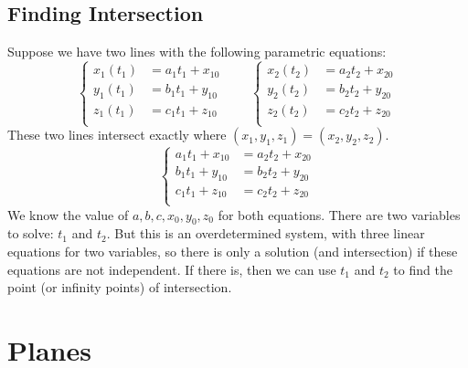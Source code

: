 \documentclass{article}
\begin{document}
\subsection{Finding Intersection}
Suppose we have two lines with the following parametric equations:
\begin{equation*}
	\left\{\begin{aligned}
		x_1(t_1)&=a_1t_1+x_{10} \\
		y_1(t_1)&=b_1t_1+y_{10} \\
		z_1(t_1)&=c_1t_1+z_{10} \\
	\end{aligned}\right.
	\qquad
	\left\{\begin{aligned}
		x_2(t_2)&=a_2t_2+x_{20} \\
		y_2(t_2)&=b_2t_2+y_{20} \\
		z_2(t_2)&=c_2t_2+z_{20} \\
	\end{aligned}\right.
\end{equation*}
These two lines intersect exactly where $(x_1,y_1,z_1)=(x_2,y_2,z_2)$.
\begin{equation*}
	\left\{\begin{aligned}
		a_1t_1+x_{10}&=a_2t_2+x_{20} \\
		b_1t_1+y_{10}&=b_2t_2+y_{20} \\
		c_1t_1+z_{10}&=c_2t_2+z_{20} \\
	\end{aligned}\right.
\end{equation*}
We know the value of $a,b,c,x_0,y_0,z_0$ for both equations. There are two variables to solve: $t_1$ and $t_2$. But this is an overdetermined system, with three linear equations for two variables, so there is only a solution (and intersection) if these equations are not independent. If there is, then we can use $t_1$ and $t_2$ to find the point (or infinity points) of intersection.

\section{Planes}
\end{document}
